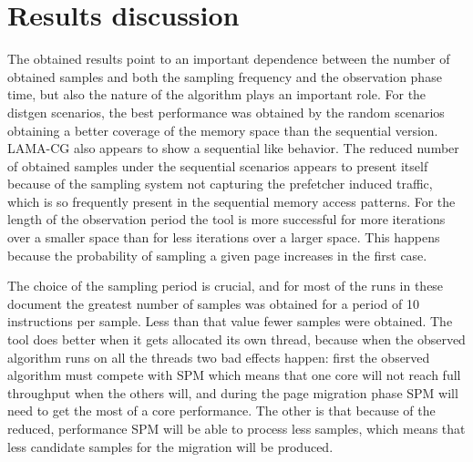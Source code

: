 \section{Results discussion}\label{section:resdiscussion}
The obtained results point to an important dependence between the number of obtained samples and both the sampling frequency and the observation phase time, but also the nature of the algorithm plays an important role. For the distgen scenarios, the best performance was obtained by the random scenarios obtaining a better coverage of the memory space than the sequential version. LAMA-CG also appears to show a sequential like behavior. The reduced number of obtained samples under the sequential scenarios appears to present itself because of the sampling system not capturing the prefetcher induced traffic, which is so frequently present in the sequential memory access patterns. For the length of the observation period the tool is more successful for more iterations over a smaller space than for less iterations over a larger space. This happens because the probability of sampling a given page increases in the first case. 

The choice of the sampling period is crucial, and for most of the runs in these document the greatest number of samples was obtained for a period of 10 instructions per sample. Less than that value fewer samples were obtained. The tool does better when it gets allocated its own thread, because when the observed algorithm runs on all the threads two bad effects happen: first the observed algorithm must compete with SPM which means that one core will not reach full throughput when the others will, and during the page migration phase SPM will need to get the most of a core performance. The other is that because of the reduced, performance SPM will be able to process less samples, which means that less candidate samples for the migration will be produced.

